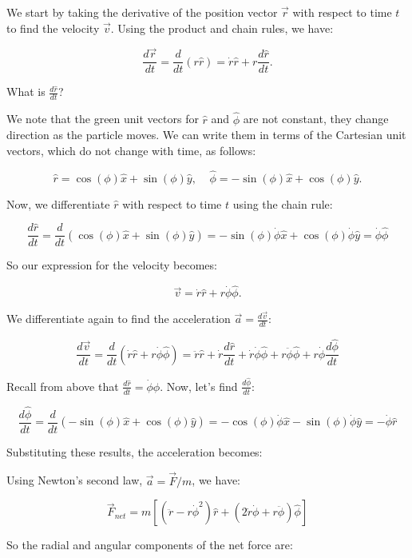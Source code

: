 \documentclass[11pt]{article}
\begin{document}
We start by taking the derivative of the position vector \(\vec{r}\)
with respect to time \(t\) to find the velocity \(\vec{v}\). Using the
product and chain rules, we have:

\[
\dfrac{d\vec{r}}{dt} = \frac{d}{dt}(r \hat{r}) = \dot{r} \hat{r} + r \frac{d\hat{r}}{dt}.
\]

What is \(\frac{d\hat{r}}{dt}\)?

We note that the green unit vectors for \(\hat{r}\) and \(\hat{\phi}\)
are not constant, they change direction as the particle moves. We can
write them in terms of the Cartesian unit vectors, which do not change
with time, as follows:

\[
\hat{r} = \cos(\phi) \hat{x} + \sin(\phi) \hat{y}, \;\;\;\; \hat{\phi} = -\sin(\phi) \hat{x} + \cos(\phi) \hat{y}.
\]

Now, we differentiate \(\hat{r}\) with respect to time \(t\) using the
chain rule:

\[
\frac{d\hat{r}}{dt} = \frac{d}{dt}(\cos(\phi) \hat{x} + \sin(\phi) \hat{y}) = -\sin(\phi) \dot{\phi} \hat{x} + \cos(\phi) \dot{\phi} \hat{y} = \dot{\phi} \hat{\phi}
\]

So our expression for the velocity becomes:

\[
\vec{v} = \dot{r} \hat{r} + r \dot{\phi} \hat{\phi}.
\]

We differentiate again to find the acceleration
\(\vec{a} = \frac{d\vec{v}}{dt}\):

\[
\frac{d\vec{v}}{dt} = \frac{d}{dt}(\dot{r} \hat{r} + r \dot{\phi} \hat{\phi}) = \ddot{r} \hat{r} + \dot{r} \frac{d\hat{r}}{dt} + \dot{r} \dot{\phi} \hat{\phi} + r \ddot{\phi} \hat{\phi} + r \dot{\phi} \frac{d\hat{\phi}}{dt}
\]

Recall from above that \(\frac{d\hat{r}}{dt} = \dot{\phi} \hat{\phi}\).
Now, let's find \(\frac{d\hat{\phi}}{dt}\):

\[
\frac{d\hat{\phi}}{dt} = \frac{d}{dt}(-\sin(\phi) \hat{x} + \cos(\phi) \hat{y}) = -\cos(\phi) \dot{\phi} \hat{x} - \sin(\phi) \dot{\phi} \hat{y} = -\dot{\phi} \hat{r}
\]

Substituting these results, the acceleration becomes:

Using Newton's second law, \(\vec{a} = \vec{F}/m\), we have:

\[
\vec{F}_{net} = m\left[(\ddot{r} - r \dot{\phi}^2) \hat{r} + (2 \dot{r} \dot{\phi} + r \ddot{\phi}) \hat{\phi}\right]
\]

So the radial and angular components of the net force are:
\end{document}
